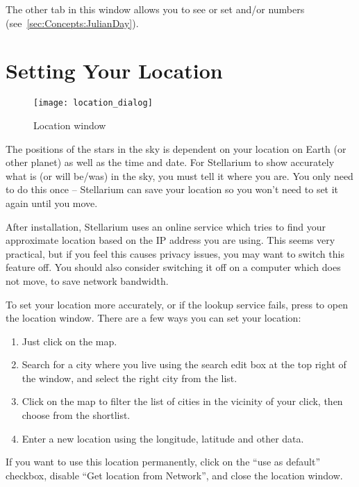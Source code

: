 The other tab in this window allows you to see or set
 and/or  numbers
(see~\ref{sec:Concepts:JulianDay}).

\section{Setting Your Location}
\label{sec:gui:location}

\begin{figure}[htb]
\centering\texttt{[image: location\_dialog]}
\caption{Location window}
\label{fig:gui:location}
\end{figure}

The positions of the stars in the sky is dependent on your location on
Earth (or other planet) as well as the time and date. For Stellarium to
show accurately what is (or will be/was) in the sky, you must tell it
where you are. You only need to do this once -- Stellarium can save your
location so you won't need to set it again until you move.

After installation, Stellarium uses an online service which tries to
find your approximate location based on the IP address you are
using. This seems very practical, but if you feel this causes privacy
issues, you may want to switch this feature off. You should also consider switching it off on a computer which does not move, to save network bandwidth.

To set your location more accurately, or if the lookup service fails,
press  to open the location window. There are a few ways you
can set your location:

\begin{enumerate}
\item Just click on the map.
\item Search for a city where you live using the search edit box at
  the top right of the window, and select the right city from the
  list.
\item Click on the map to filter the list of cities in the vicinity of
  your click, then choose from the shortlist.
\item Enter a new location using the longitude, latitude and other
  data.
\end{enumerate}

\noindent If you want to use this location permanently, click on the
``use as default'' checkbox, disable ``Get location from Network'',
and close the location window.



